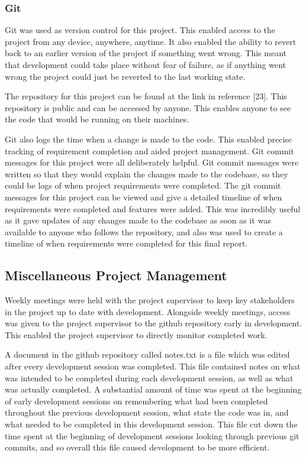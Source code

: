\documentclass{article}
\begin{document}
\subsubsection{Git}

Git was used as version control for this project. This enabled access to the project from any device, anywhere, anytime. It also enabled the ability to revert back to an earlier version of the project if something went wrong. This meant that development could take place without fear of failure, as if anything went wrong the project could just be reverted to the last working state. \par

The repository for this project can be found at the link in reference [23]. This repository is public and can be accessed by anyone. This enables anyone to see the code that would be running on their machines. \par

Git also logs the time when a change is made to the code. This enabled precise tracking of requirement completion and aided project management. Git commit messages for this project were all deliberately helpful. Git commit messages were written so that they would explain the changes made to the codebase, so they could be logs of when project requirements were completed. The git commit messages for this project can be viewed and give a detailed timeline of when requirements were completed and features were added. This was incredibly useful as it gave updates of any changes made to the codebase as soon as it was available to anyone who follows the repository, and also was used to create a timeline of when requirements were completed for this final report. \par

\subsection{Miscellaneous Project Management}

Weekly meetings were held with the project supervisor to keep key stakeholders in the project up to date with development. Alongside weekly meetings, access was given to the project supervisor to the  github repository early in development. This enabled the project supervisor to directly monitor completed work. \par

A document in the github repository called notes.txt is a file which was edited after every development session was completed. This file contained notes on what was intended to be completed during each development session, as well as what was actually completed. A substantial amount of time was spent at the beginning of early development sessions on remembering what had been completed throughout the previous development session, what state the code was in, and what needed to be completed in this development session. This file cut down the time spent at the beginning of development sessions looking through previous git commits, and so overall this file caused development to be more efficient. \par
\end{document}

